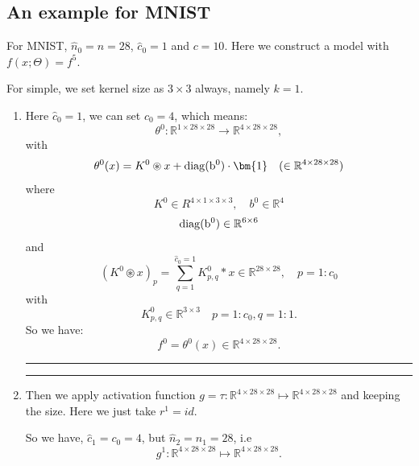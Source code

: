 \subsection{An example for MNIST}
For MNIST, $\hat n_0 = n = 28$, $\hat c_0 = 1$ and $c = 10$. Here we construct a
model with $f(x; \Theta) = f^5$.

For simple, we set kernel size as $3 \times 3$ always, namely $k=1$.  
\begin{enumerate}
	\bigskip \hrule \bigskip  
	\item Here $\hat c_0 = 1$, we can set $c_0 = 4$, which means:
	\begin{equation}
	\theta^0 : \mathbb R^{1\times 28 \times 28} \to \mathbb R^{4 \times 28 \times28},
	\end{equation}
	with 
	\begin{equation}
	\theta^0(x) = K^0 \circledast x + {\rm{diag}(b^0) }\cdot \bm{1} \quad (\in
	\mathbb R^{4\times 28\times 28})
	\end{equation}
	where 
	$$
	K^0 \in R^{4 \times 1 \times 3 \times 3}, \quad b^0 \in \mathbb R^{4}
	$$
	$$
	\rm{diag}(b^0) 
	\in \mathbb R^{6\times 6}
	$$
	and 
	\begin{equation}
	(K^0 \circledast x)_p = \sum_{q = 1}^{\hat c_0 = 1} K^0_{p,q}\ast x \in \mathbb R^{28 \times 28}, \quad p = 1:c_0
	\end{equation}
	with 
	$$
	K^0_{p,q} \in \mathbb R^{3 \times 3} \quad p = 1:c_0, q = 1:1 .
	$$
	So we have:
	\begin{equation}
	f^0 = \theta^0( x)  \in \mathbb R^{4 \times 28 \times 28}.
	\end{equation}
	
	\bigskip \hrule \bigskip  
	\bigskip \hrule \bigskip  
	
	\item Then we apply activation function $g = \tau : \mathbb R^{4 \times 28 \times 28} \mapsto \mathbb R^{4 \times 28 \times 28} $ and keeping the size.  Here we just take $r^1 = id$.
	
	So we have, $\hat c_1 = c_0 = 4$, but $\hat n_2 = { n_1} = 28$, i.e
	\begin{equation}
	g^1: \mathbb R^{4 \times 28 \times 28} \mapsto \mathbb R^{4\times 28 \times 28}.
	\end{equation}
	

\end{enumerate}
